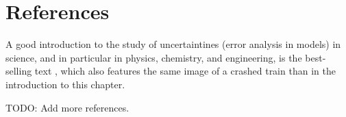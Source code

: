 %
%

\section*{References}

A good introduction to the study of uncertaintines (error analysis in models) in science, and in particular in physics, chemistry, and engineering, is the best-selling text \cite{taylor2022introduction}, which also features the same image of a crashed train than in the introduction to this chapter.

{\color{red} TODO: Add more references.}

